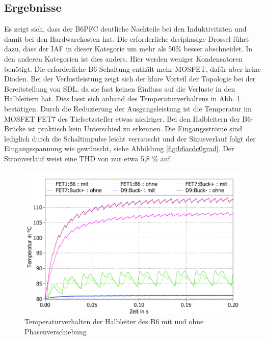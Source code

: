 \subsection{Ergebnisse}
			Es zeigt sich, dass der \gls{B6PFC} deutliche Nachteile bei den Induktivitäten und damit bei den Hardwarekosten hat. Die erforderliche dreiphasige Drossel führt dazu, dass der IAF in dieser Kategorie um mehr als 50\% besser abschneidet.
			In den anderen Kategorien ist dies anders. Hier werden weniger Kondensatoren benötigt. Die erforderliche B6-Schaltung enthält mehr \gls{MOSFET}, dafür aber keine Dioden. Bei der Verlustleistung zeigt sich der klare Vorteil der Topologie bei der Bereitstellung von \gls{SDL}, da sie fast keinen Einfluss auf die Verluste in den Halbleitern hat. Dies lässt sich anhand des Temperaturverhaltens in Abb. \ref{fig:b6temp030grad} bestätigen. Durch die Reduzierung der Ausgangsleistung ist die Temperatur im \gls{MOSFET} FET7 des Tiefsetzsteller etwas niedriger. Bei den Halbleitern der B6-Brücke ist praktisch kein Unterschied zu erkennen. Die Eingangsströme sind lediglich durch die Schaltimpulse leicht verrauscht und der Sinusverlauf folgt der Eingangsspannung wie gewünscht, siehe Abbildung \ref{fig:b6acdc0grad}.  Der Stromverlauf weist eine THD von nur etwa 5,8 \% auf.
			\begin{figure}
				\centering
				\includegraphics[width=1\linewidth]{content/Grafiken/B6_Temp_0&30Grad}
				\caption{Temperaturverhalten der Halbleiter des B6 mit und ohne Phasenverschiebung}
				\label{fig:b6temp030grad}
			\end{figure}
